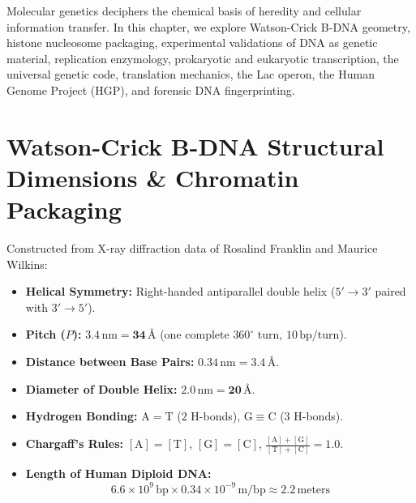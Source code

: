 \documentclass[10pt,twoside,openright]{book}
\begin{document}
Molecular genetics deciphers the chemical basis of heredity and cellular information transfer. In this chapter, we explore Watson-Crick B-DNA geometry, histone nucleosome packaging, experimental validations of DNA as genetic material, replication enzymology, prokaryotic and eukaryotic transcription, the universal genetic code, translation mechanics, the Lac operon, the Human Genome Project (HGP), and forensic DNA fingerprinting.

\section{Watson-Crick B-DNA Structural Dimensions \& Chromatin Packaging}

\begin{formulabox}
Constructed from X-ray diffraction data of Rosalind Franklin and Maurice Wilkins:
\begin{itemize}[leftmargin=*]
  \item \textbf{Helical Symmetry:} Right-handed antiparallel double helix ($5'\to 3'$ paired with $3'\to 5'$).
  \item \textbf{Pitch ($P$):} $\mathbf{3.4\,\mathrm{nm} = 34\,\text{\AA}}$ (one complete $360^\circ$ turn, $10\,\mathrm{bp/turn}$).
  \item \textbf{Distance between Base Pairs:} $\mathbf{0.34\,\mathrm{nm} = 3.4\,\text{\AA}}$.
  \item \textbf{Diameter of Double Helix:} $\mathbf{2.0\,\mathrm{nm} = 20\,\text{\AA}}$.
  \item \textbf{Hydrogen Bonding:} $\mathrm{A = T}$ ($2$ H-bonds), \quad $\mathrm{G \equiv C}$ ($3$ H-bonds).
  \item \textbf{Chargaff's Rules:} $[\mathrm{A}] = [\mathrm{T}]$, \quad $[\mathrm{G}] = [\mathrm{C}]$, \quad $\frac{[\mathrm{A}] + [\mathrm{G}]}{[\mathrm{T}] + [\mathrm{C}]} = 1.0$.
  \item \textbf{Length of Human Diploid DNA:}
  \[
    6.6 \times 10^9\,\mathrm{bp} \times 0.34 \times 10^{-9}\,\mathrm{m/bp} \approx \mathbf{2.2\,\mathrm{meters}}
  \]
\end{itemize}


\end{formulabox}
\end{document}
